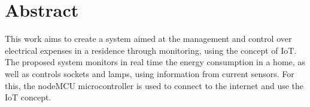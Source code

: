 \chapter*{Abstract}
This work aims to create a system aimed at the management and control over electrical expenses in a residence through monitoring, using the concept of IoT. The proposed system monitors in real time the energy consumption in a home, as well as controls sockets and lamps, using information from current sensors. For this, the nodeMCU microcontroller is used to connect to the internet and use the IoT concept.


\noindent 
